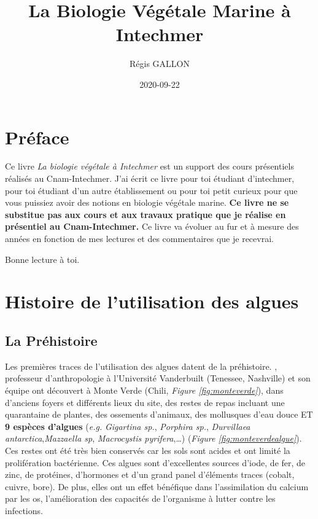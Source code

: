 \documentclass[
]{book}
\title{La Biologie Végétale Marine à Intechmer}
\author{Régis GALLON}
\date{2020-09-22}
\begin{document}
\maketitle

{
\hypersetup{linkcolor=}
\setcounter{tocdepth}{1}
\tableofcontents
}
\hypertarget{pruxe9face}{%
\chapter*{Préface}\label{pruxe9face}}

Ce livre \emph{La biologie végétale à Intechmer} est un support des cours présentiels réalisés au Cnam-Intechmer. J'ai écrit ce livre pour toi étudiant d'intechmer, pour toi étudiant d'un autre établissement ou pour toi petit curieux pour que vous puissiez avoir des notions en biologie végétale marine. \textbf{Ce livre ne se substitue pas aux cours et aux travaux pratique que je réalise en présentiel au Cnam-Intechmer.} Ce livre va évoluer au fur et à mesure des années en fonction de mes lectures et des commentaires que je recevrai.

Bonne lecture à toi.

\hypertarget{histoire}{%
\chapter{Histoire de l'utilisation des algues}\label{histoire}}

\hypertarget{la-pruxe9histoire}{%
\section{La Préhistoire}\label{la-pruxe9histoire}}

Les premières traces de l'utilisation des algues datent de la préhistoire. \citet{dillehay2008}, professeur d'anthropologie à l'Université Vanderbuilt (Tenessee, Nashville) et son équipe ont découvert à Monte Verde (Chili, \emph{Figure \ref{fig:monteverde}}), dans d'anciens foyers et différents lieux du site, des restes de repas incluant une quarantaine de plantes, des ossements d'animaux, des mollusques d'eau douce ET \textbf{9 espèces d'algues} (\emph{e.g.} \emph{Gigartina sp.}, \emph{Porphira sp.}, \emph{Durvillaea antarctica},\emph{Mazzaella sp}, \emph{Macrocystis pyrifera},\ldots) (\emph{Figure \ref{fig:monteverdealgue}}). Ces restes ont été très bien conservés car les sols sont acides et ont limité la prolifération bactérienne.
Ces algues sont d'excellentes sources d'iode, de fer, de zinc, de protéines, d'hormones et d'un grand panel d'éléments traces (cobalt, cuivre, bore). De plus, elles ont un effet bénéfique dans l'assimilation du calcium par les os, l'amélioration des capacités de l'organisme à lutter contre les infections.
\end{document}
